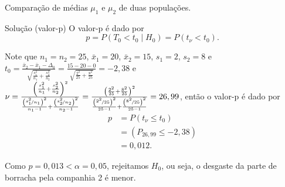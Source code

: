 \documentclass[9pt]{beamer}
\begin{document}
\begin{frame}{Comparação de médias $\mu_1$ e $\mu_2$ de duas populações.}

\begin{block}{Solução (valor-p)}
	O valor-p é dado por
	$$p = P (T_0 < t_0 \mid H_0) = P(t_\nu < t_0).$$
	
	Note que $n_1=n_2=25$, $\bar{x}_1=20$, $\bar{x}_2=15$, $s_1=2$, $s_2=8$ e $t_0 = \frac{\bar{x}_2 - \bar{x}_1- \Delta_0}{\sqrt{\frac{s_1^2}{n_1} + \frac{s_2^2}{n_2}}} = \frac{15 - 20  - 0}{\sqrt{\frac{2^2}{25} + \frac{8^2}{25}}}=-2,38$ e $\nu = \frac{\left( \frac{s_1^2}{n_1} + \frac{s_2^2}{n_2} \right)^2}{\frac{\left(\nicefrac{s_1^2}{n_1}\right)^2}{n_1-1} + \frac{\left(\nicefrac{s_2^2}{n_2}\right)^2}{n_2-1}} = \frac{\left( \frac{2^2}{25} + \frac{8^2}{25} \right)^2}{\frac{\left(\nicefrac{2^2}{25}\right)^2}{25-1} + \frac{\left(\nicefrac{8^2}{25}\right)^2}{25-1}} = 26,99$, então o valor-p é dado por
	\begin{align*}
		p &= P(t_\nu \leq t_0)\\
		&= (P_{26,99} \leq -2,38)\\
		&= 0,012.
	\end{align*}
	
	Como $p=0,013 < \alpha=0,05$, rejeitamos $H_0$, ou seja, o desgaste da parte de borracha pela companhia 2 é menor.
\end{block}

\end{frame}
\end{document}
